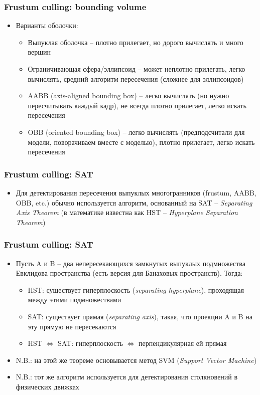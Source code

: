 \documentclass{beamer}
\begin{document}
\begin{frame}[fragile]
\frametitle{Frustum culling: bounding volume}
\begin{itemize}
\item Варианты оболочки:
\pause
\begin{itemize}
\item Выпуклая оболочка -- плотно прилегает, но дорого вычислять и много вершин
\pause
\item Ограничивающая сфера/эллипсоид -- может неплотно прилегать, легко вычислять, средний алгоритм пересечения (сложнее для эллипсоидов)
\pause
\item AABB (axis-aligned bounding box) -- легко вычислять (но нужно пересчитывать каждый кадр), не всегда плотно прилегает, легко искать пересечения
\pause
\item OBB (oriented bounding box) -- легко вычислять (предподсчитали для модели, поворачиваем вместе с моделью), плотно прилегает, легко искать пересечения
\end{itemize}
\end{itemize}
\end{frame}

\begin{frame}[fragile]
\frametitle{Frustum culling: SAT}
\begin{itemize}
\item Для детектирования пересечения выпуклых многогранников (frustum, AABB, OBB, etc.) обычно используется алгоритм, основанный на SAT -- \textit{Separating Axis Theorem} (в математике известна как HST -- \textit{Hyperplane Separation Theorem})
\end{itemize}
\end{frame}

\begin{frame}[fragile]
\frametitle{Frustum culling: SAT}
\begin{itemize}
\item Пусть A и B -- два непересекающихся замкнутых выпуклых подмножества Евклидова пространства (есть версия для Банаховых пространств). Тогда:
\pause
\begin{itemize}
\item HST: существует гиперплоскость (\textit{separating hyperplane}), проходящая между этими подмножествами
\pause
\item SAT: существует прямая (\textit{separating axis}), такая, что проекции A и B на эту прямую не пересекаются
\pause
\item HST \begin{math}\Leftrightarrow\end{math} SAT: гиперплоскость \begin{math}\Leftrightarrow\end{math} перпендикулярная ей прямая
\end{itemize}
\pause
\item N.B.: на этой же теореме основывается метод SVM (\textit{Support Vector Machine})
\pause
\item N.B.: тот же алгоритм используется для детектирования столкновений в физических движках
\end{itemize}
\end{frame}
\end{document}
